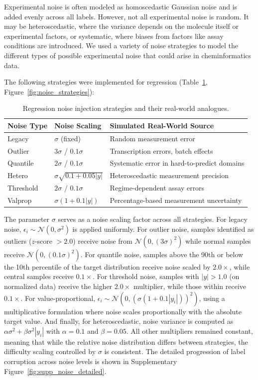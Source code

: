 \documentclass[pdflatex,sn-mathphys-num]{sn-jnl}%
\theoremstyle{thmstyleone}%
\theoremstyle{thmstyletwo}%
\theoremstyle{thmstylethree}%
\begin{document}
Experimental noise is often modeled as homoscedastic Gaussian noise and is added evenly across all labels. However, not all experimental noise is random. It may be heteroscedastic, where the variance depends on the molecule itself or experimental factors, or systematic, where biases from factors like assay conditions are introduced. We used a variety of noise strategies to model the different types of possible experimental noise that could arise in cheminformatics data. 

The following strategies were implemented for regression (Table~\ref{tab:regression_noise}, Figure~\ref{fig:noise_strategies}):
\begin{table}[h]
\centering
\begin{tabular}{lll}
\toprule
\textbf{Noise Type} & \textbf{Noise Scaling} & \textbf{Simulated Real-World Source} \\
\midrule
Legacy & $\sigma$ (fixed) & Random measurement error \\
Outlier & $3\sigma$ / $0.1\sigma$ & Transcription errors, batch effects \\
Quantile & $2\sigma$ / $0.1\sigma$ & Systematic error in hard-to-predict domains \\
Hetero & $\sigma\sqrt{0.1 + 0.05|y|}$ & Heteroscedastic measurement precision \\
Threshold & $2\sigma$ / $0.1\sigma$ & Regime-dependent assay errors \\
Valprop & $\sigma(1 + 0.1|y|)$ & Percentage-based measurement uncertainty \\
\bottomrule
\end{tabular}
\caption{Regression noise injection strategies and their real-world analogues.}
\label{tab:regression_noise}
\end{table}

The parameter $\sigma$ serves as a noise scaling factor across all strategies. For legacy noise, $\epsilon_i \sim \mathcal{N}(0, \sigma^2)$ is applied uniformly. For outlier noise, samples identified as outliers ($z$-score $> 2.0$) receive noise from $\mathcal{N}(0, (3\sigma)^2)$ while normal samples receive $\mathcal{N}(0, (0.1\sigma)^2)$. For quantile noise, samples above the 90th or below the 10th percentile of the target distribution receive noise scaled by $2.0\times$, while central samples receive $0.1\times$. For threshold noise, samples with $|y| > 1.0$ (on normalized data) receive the higher $2.0\times$ multiplier, while those within receive $0.1\times$. For value-proportional, $\epsilon_i \sim \mathcal{N}(0, (\sigma(1 + 0.1|y_i|))^2)$, using a multiplicative formulation where noise scales proportionally with the absolute target value. And finally, for heteroscedastic, noise variance is computed as $\alpha \sigma^2 + \beta \sigma^2 |y_i|$ with $\alpha = 0.1$ and $\beta = 0.05$. All other multipliers remained constant, meaning that while the relative noise distribution differs between strategies, the difficulty scaling controlled by $\sigma$ is consistent. The detailed progression of label corruption across noise levels is shown in Supplementary Figure~\ref{fig:supp_noise_detailed}.
\end{document}
